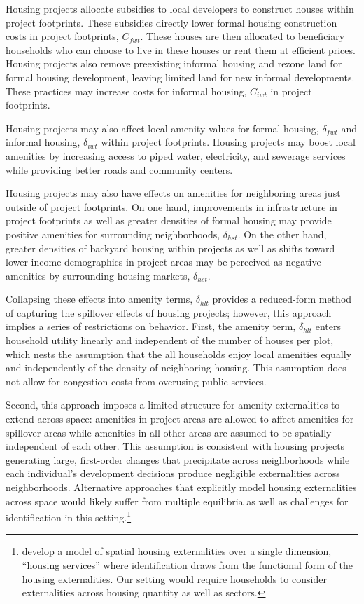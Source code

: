 \documentclass[12pt]{article}
\begin{document}
Housing projects allocate subsidies to local developers to construct houses within project footprints.  These subsidies directly lower formal housing construction costs in project footprints, $C_{fwt}$.  These houses are then allocated to beneficiary households who can choose to live in these houses or rent them at efficient prices.  Housing projects also remove preexisting informal housing and rezone land for formal housing development, leaving limited land for new informal developments.  These practices may increase costs for informal housing, $C_{iwt}$ in project footprints.

Housing projects may also affect local amenity values for formal housing, $\delta_{fwt}$ and informal housing, $\delta_{iwt}$ within project footprints.  Housing projects may boost local amenities by increasing access to piped water, electricity, and sewerage services while providing better roads and community centers.  

Housing projects may also have effects on amenities for neighboring areas just outside of project footprints.  On one hand, improvements in infrastructure in project footprints as well as greater densities of formal housing may provide positive amenities for surrounding neighborhoods, $\delta_{hst}$.  On the other hand, greater densities of backyard housing within projects as well as shifts toward lower income demographics in project areas may be perceived as negative amenities by surrounding housing markets, $\delta_{hst}$.  

Collapsing these effects into amenity terms, $\delta_{hlt}$ provides a reduced-form method of capturing the spillover effects of housing projects; however, this approach implies a series of restrictions on behavior.  First, the amenity term, $\delta_{hlt}$ enters household utility linearly and independent of the number of houses per plot, which nests the assumption that the all households enjoy local amenities equally and independently of the density of neighboring housing.  This assumption does not allow for congestion costs from overusing public services.

Second, this approach imposes a limited structure for amenity externalities to extend across space:  amenities in project areas are allowed to affect amenities for spillover areas while amenities in all other areas are assumed to be spatially independent of each other.  This assumption is consistent with housing projects generating large, first-order changes that precipitate across neighborhoods while each individual's development decisions produce negligible externalities across neighborhoods.  Alternative approaches that explicitly model housing externalities across space would likely suffer from multiple equilibria as well as challenges for identification in this setting.\footnote{\cite{rossi2010housing} develop a model of spatial housing externalities over a single dimension, ``housing services'' where identification draws from the functional form of the housing externalities.  Our setting would require households to consider externalities across housing quantity as well as sectors.}
\end{document}
